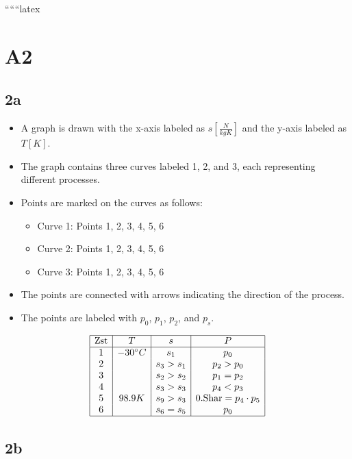 
``````latex


\section*{A2}

\subsection*{2a}

\begin{itemize}
    \item A graph is drawn with the x-axis labeled as $s \left[ \frac{N}{kgK} \right]$ and the y-axis labeled as $T \left[ K \right]$.
    \item The graph contains three curves labeled 1, 2, and 3, each representing different processes.
    \item Points are marked on the curves as follows:
        \begin{itemize}
            \item Curve 1: Points 1, 2, 3, 4, 5, 6
            \item Curve 2: Points 1, 2, 3, 4, 5, 6
            \item Curve 3: Points 1, 2, 3, 4, 5, 6
        \end{itemize}
    \item The points are connected with arrows indicating the direction of the process.
    \item The points are labeled with $p_0$, $p_1$, $p_2$, and $p_s$.
\end{itemize}

\[
\begin{array}{|c|c|c|c|}
\hline
\text{Zst} & T & s & P \\
\hline
1 & -30^\circ C & s_1 & p_0 \\
2 & & s_3 > s_1 & p_2 > p_0 \\
3 & & s_2 > s_2 & p_1 = p_2 \\
4 & & s_3 > s_3 & p_4 < p_3 \\
5 & 98.9K & s_9 > s_3 & 0.\text{Shar} = p_4 \cdot p_5 \\
6 & & s_6 = s_5 & p_0 \\
\hline
\end{array}
\]

\subsection*{2b}

